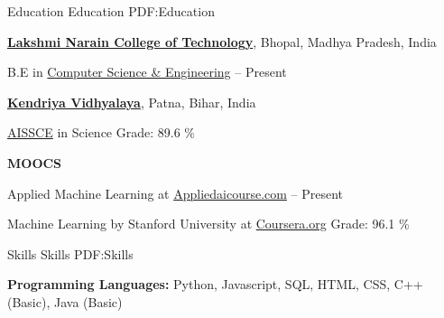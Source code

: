 \documentclass[letterpaper,MMMyyyy,nonstopmode]{simpleresumecv}
\begin{document}
    \begin{Body}
    
    
    \Section
    {Education}
    {Education}
    {PDF:Education}
    
        \Entry
            \href{http://http://www.lnctgroup.in/LNCT}
            {\textbf{Lakshmi Narain College of Technology}},
            Bhopal, Madhya Pradesh, India
            
            \Gap

            \BulletItem
                B.E in 
                \href{http://www.lnctgroup.in/Bachelor-Of-Engineering/Computer-Science-Engineering}
                    {Computer Science \& Engineering}
                \hfill
                 -- Present
        
        
        \BigGap


        \Entry
            \href{http://http://kvkankarbaghpatna.org.in/}
            {\textbf{Kendriya Vidhyalaya}},
            Patna, Bihar, India
            
            \Gap

            \BulletItem
                \href{http://cbse.nic.in/newsite/index.html}
                    {AISSCE}
                    in Science
                \hfill
                \SubBulletItem
                    Grade: 89.6 \%
        

        \BigGap

        
        \Entry
            \textbf{MOOCS}
            
            \BulletItem
                Applied Machine Learning at \href{https://www.appliedaicourse.com/}{Appliedaicourse.com}
                \hfill
                 -- Present
            
            \Gap
            
            \BulletItem
                Machine Learning by Stanford University at \href{https://coursera.org}{Coursera.org}
                \SubBulletItem
                    Grade: 96.1 \%
    
    
    \Section
    {Skills}
    {Skills}
    {PDF:Skills}
    
    
        \Entry
            \textbf{Programming Languages:}
            Python, Javascript, SQL, HTML, CSS, C++ (Basic), Java (Basic)
        

\end{Body}
\end{document}
